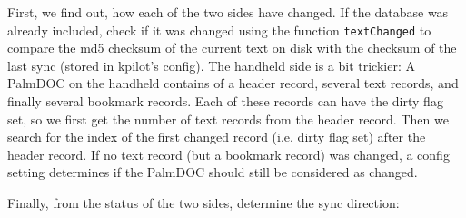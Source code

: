 \documentclass[10pt,a4paper]{article}
\newcommand{\code}[1]{{\small\texttt{#1}}}
\begin{document}
First, we find out, how each of the two sides have changed.
If the database was already included, check if it was changed using the function \code{textChanged} to compare the md5 checksum of the current text on disk with the checksum of the last sync (stored in kpilot's config). The handheld side is a bit trickier: A PalmDOC on the handheld contains of a header record, several text records, and finally several bookmark records. Each of these records can have the dirty flag set, so we first get the number of text records from the header record. Then we search for the index of the first changed record (i.e. dirty flag set) after the header record. If no text record (but a bookmark record) was changed, a config setting determines if the PalmDOC should still be considered as changed.

Finally, from the status of the two sides, determine the sync direction:
\end{document}
